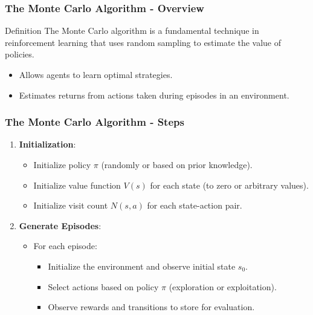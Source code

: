 \documentclass[aspectratio=169]{beamer}
\begin{document}
\begin{frame}[fragile]
    \frametitle{The Monte Carlo Algorithm - Overview}
    \begin{block}{Definition}
        The Monte Carlo algorithm is a fundamental technique in reinforcement learning that uses random sampling to estimate the value of policies. 
    \end{block}
    \begin{itemize}
        \item Allows agents to learn optimal strategies.
        \item Estimates returns from actions taken during episodes in an environment.
    \end{itemize}
\end{frame}

\begin{frame}[fragile]
    \frametitle{The Monte Carlo Algorithm - Steps}
    \begin{enumerate}
        \item \textbf{Initialization}:
        \begin{itemize}
            \item Initialize policy $\pi$ (randomly or based on prior knowledge).
            \item Initialize value function $V(s)$ for each state (to zero or arbitrary values).
            \item Initialize visit count $N(s, a)$ for each state-action pair.
        \end{itemize}
        
        \item \textbf{Generate Episodes}:
        \begin{itemize}
            \item For each episode:
            \begin{itemize}
                \item Initialize the environment and observe initial state $s_0$.
                \item Select actions based on policy $\pi$ (exploration or exploitation).
                \item Observe rewards and transitions to store for evaluation.
            \end{itemize}
        \end{itemize}
    \end{enumerate}
\end{frame}
\end{document}
